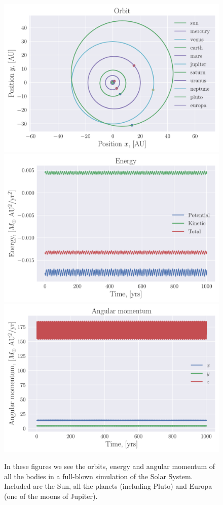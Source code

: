 \documentclass[reprint, english,notitlepage,nofootinbib]{revtex4-1}  %
\begin{document}
\begin{figure}[h]
	\centering
	\includegraphics[width=\linewidth]{../output/all-verlet-5-8-2.pdf}
  \includegraphics[width=\linewidth]{../output/all-verlet-5-8-2_energy.pdf}
  \includegraphics[width=\linewidth]{../output/all-verlet-5-8-2_ang_mom.pdf}
	\caption{In these figures we see the orbits, energy and angular momentum of all the bodies in a full-blown simulation of the Solar System. Included are the Sun, all the planets (including Pluto) and Europa (one of the moons of Jupiter).}
	\label{fig:all}
\end{figure}
\end{document}
